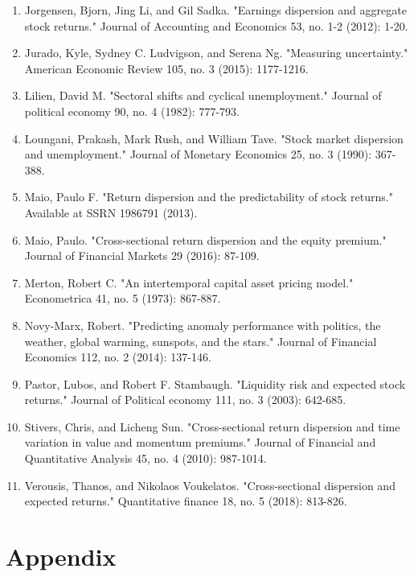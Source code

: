 \documentclass[12pt]{article}
\begin{document}
\begin{enumerate}
    \item{Jorgensen, Bjorn, Jing Li, and Gil Sadka. "Earnings dispersion and aggregate stock returns." Journal of Accounting and Economics 53, no. 1-2 (2012): 1-20.}
    \item{Jurado, Kyle, Sydney C. Ludvigson, and Serena Ng. "Measuring uncertainty." American Economic Review 105, no. 3 (2015): 1177-1216.}
    \item{Lilien, David M. "Sectoral shifts and cyclical unemployment." Journal of political economy 90, no. 4 (1982): 777-793.}
    \item{Loungani, Prakash, Mark Rush, and William Tave. "Stock market dispersion and unemployment." Journal of Monetary Economics 25, no. 3 (1990): 367-388.}
    \item{Maio, Paulo F. "Return dispersion and the predictability of stock returns." Available at SSRN 1986791 (2013).}
    \item{Maio, Paulo. "Cross-sectional return dispersion and the equity premium." Journal of Financial Markets 29 (2016): 87-109.}
    \item{Merton, Robert C. "An intertemporal capital asset pricing model." Econometrica 41, no. 5 (1973): 867-887.}
    \item{Novy-Marx, Robert. "Predicting anomaly performance with politics, the weather, global warming, sunspots, and the stars." Journal of Financial Economics 112, no. 2 (2014): 137-146.}
    \item{Pastor, Lubos, and Robert F. Stambaugh. "Liquidity risk and expected stock returns." Journal of Political economy 111, no. 3 (2003): 642-685.}
    \item{Stivers, Chris, and Licheng Sun. "Cross-sectional return dispersion and time variation in value and momentum premiums." Journal of Financial and Quantitative Analysis 45, no. 4 (2010): 987-1014.}
    \item{Verousis, Thanos, and Nikolaos Voukelatos. "Cross-sectional dispersion and expected returns." Quantitative finance 18, no. 5 (2018): 813-826.}

\end{enumerate}

\newpage


\section*{Appendix}
\end{document}
